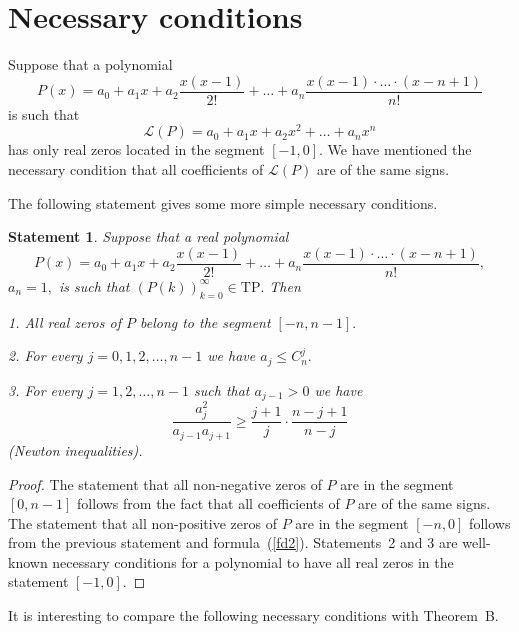 \documentclass[12pt]{amsart}
\newcounter{count}
\numberwithin{count}{section}
\newtheorem{Statement}[count]{Statement}
\begin{document}
\section{Necessary conditions}

Suppose that a polynomial 
$$P(x)= a_0 + a_1 x +a_2 \frac{x(x-1)}{2!} 
+  \ldots +a_n \frac{x(x-1)\cdot \ldots \cdot (x-n+1)}{n!}$$
is such that
$$\mathcal{L}(P)
= a_0 +a_1 x +a_2 x^2 + \ldots + a_n x^n$$ 
has only real zeros located in the segment $[-1, 0].$ We have mentioned  the 
necessary condition that all  coefficients of $\mathcal{L}(P)$ are of the same signs. 

The following statement gives some more simple necessary conditions.

\begin{Statement}
\label{st1}
Suppose that a real polynomial 
$$P(x)= a_0 + a_1 x +a_2 \frac{x(x-1)}{2!} 
+  \ldots +a_n \frac{x(x-1)\cdot \ldots \cdot (x-n+1)}{n!},$$
$a_n=1, $   is such that $(P(k))_{k=0}^\infty \in \mathrm{TP}.$ Then

1. All real zeros of $P$ belong to the segment $[- n, n-1].$

2. For every $j=0, 1, 2, \ldots, n-1$ we have $a_j \leq C_n^j.$

3. For every $j= 1, 2, \ldots, n-1$ such that $a_{j-1}>0$  we have
$$\frac{a_j^2}{a_{j-1}a_{j+1}} \geq \frac{j+1}{j} \cdot \frac{n-j+1}{n-j}$$
(Newton inequalities).

\end{Statement}

\begin{proof}

The statement that all non-negative zeros of $P$ are in the segment $[0, n-1]$
follows from the fact that all coefficients of $P$ are of the same signs.
The statement that all non-positive zeros of $P$ are in the segment $[-n, 0]$
follows from the previous statement and formula~(\ref{fd2}). Statements~2 and 3
are well-known necessary conditions for a polynomial to have all real zeros
in the statement $[-1, 0].$
\end{proof}

It is interesting to compare the following necessary conditions with Theorem~B.
\end{document}
